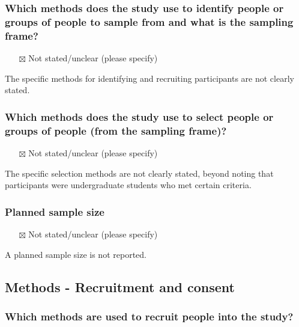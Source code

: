 \documentclass[
  doc, a4paper]{apa7}
\providecommand{\tightlist}{%
  \setlength{\itemsep}{0pt}\setlength{\parskip}{0pt}}
\begin{document}
\subsubsection{Which methods does the study use to identify people or groups of people to sample from and what is the sampling frame?}\label{which-methods-does-the-study-use-to-identify-people-or-groups-of-people-to-sample-from-and-what-is-the-sampling-frame}

\begin{itemize}
\tightlist
\item[$\boxtimes$]
  Not stated/unclear (please specify)
\end{itemize}

The specific methods for identifying and recruiting participants are not clearly stated.

\subsubsection{Which methods does the study use to select people or groups of people (from the sampling frame)?}\label{which-methods-does-the-study-use-to-select-people-or-groups-of-people-from-the-sampling-frame}

\begin{itemize}
\tightlist
\item[$\boxtimes$]
  Not stated/unclear (please specify)
\end{itemize}

The specific selection methods are not clearly stated, beyond noting that participants were undergraduate students who met certain criteria.

\subsubsection{Planned sample size}\label{planned-sample-size}

\begin{itemize}
\tightlist
\item[$\boxtimes$]
  Not stated/unclear (please specify)
\end{itemize}

A planned sample size is not reported.

\subsection{Methods - Recruitment and consent}\label{methods---recruitment-and-consent}

\subsubsection{Which methods are used to recruit people into the study?}\label{which-methods-are-used-to-recruit-people-into-the-study}
\end{document}
